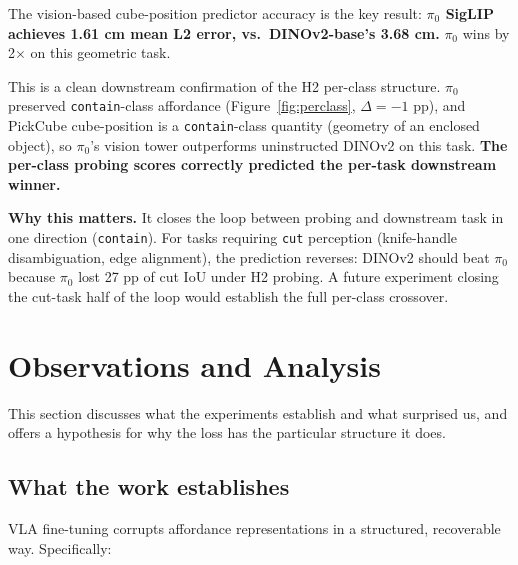 \documentclass[11pt]{article}
\begin{document}
The vision-based cube-position predictor accuracy is the key result:
\textbf{$\pi_0$ SigLIP achieves 1.61 cm mean L2 error, vs.\ DINOv2-base's
3.68 cm.} $\pi_0$ wins by 2$\times$ on this geometric task.

This is a clean downstream confirmation of the H2 per-class structure.
$\pi_0$ preserved \texttt{contain}-class affordance (Figure~\ref{fig:perclass},
$\Delta = -1$ pp), and PickCube cube-position is a
\texttt{contain}-class quantity (geometry of an enclosed object), so
$\pi_0$'s vision tower outperforms uninstructed DINOv2 on this task.
\textbf{The per-class probing scores correctly predicted the per-task
downstream winner.}

\textbf{Why this matters.} It closes the loop between probing and
downstream task in one direction (\texttt{contain}). For tasks
requiring \texttt{cut} perception (knife-handle disambiguation, edge
alignment), the prediction reverses: DINOv2 should beat $\pi_0$
because $\pi_0$ lost 27 pp of cut IoU under H2 probing. A future
experiment closing the cut-task half of the loop would establish the
full per-class crossover.

\section{Observations and Analysis}
\label{sec:observations}

This section discusses what the experiments establish and what
surprised us, and offers a hypothesis for why the loss has the
particular structure it does.

\subsection{What the work establishes}

VLA fine-tuning corrupts affordance representations in a structured,
recoverable way. Specifically:
\end{document}
